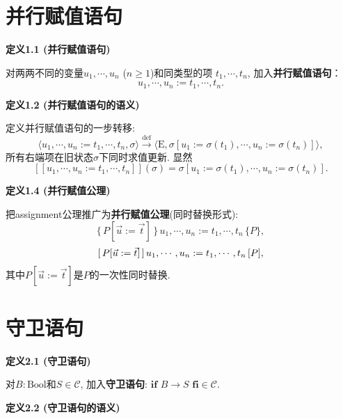 \documentclass[UTF8]{ctexart}
\begin{document}
\setlength{\abovedisplayskip}{1pt}
\setlength{\belowdisplayskip}{1pt}

\section{并行赋值语句}

\hypertarget{sec:定义1.1}{}
\noindent\textbf{定义1.1 (并行赋值语句)}

对两两不同的变量$u_1,\cdots,u_n$ ($n\geqslant1$)和同类型的项
$t_1,\cdots,t_n$, 加入\textbf{并行赋值语句}：
\[
    u_1,\cdots,u_n:=t_1,\cdots,t_n.
\]

\vspace{10pt}

\hypertarget{sec:定义1.2}{}
\noindent\textbf{定义1.2 (并行赋值语句的语义)}

定义并行赋值语句的一步转移:
\[
    \langle u_1,\cdots,u_n:=t_1,\cdots,t_n,\sigma\rangle
    \overset{\mathrm{def}}{\to}
    \langle\mathrm{E},\sigma[u_1:=\sigma(t_1),\cdots,u_n:=\sigma(t_n)]\rangle,
\]
所有右端项在旧状态$\sigma$下同时求值更新. 显然
\[
    [\![u_1,\cdots,u_n:=t_1,\cdots,t_n]\!](\sigma)
    =\sigma[u_1:=\sigma(t_1),\cdots,u_n:=\sigma(t_n)].
\]

\vspace{10pt}

\hypertarget{sec:定义1.4}{}
\noindent\textbf{定义1.4 (并行赋值公理)}

把assignment公理推广为\textbf{并行赋值公理}(同时替换形式):
\[
    \{\,P[\vec{u}:=\vec{t}]\,\}\,u_1,\cdots,u_n:=t_1,\cdots,t_n\,\{P\},
\]
\[
    [\,P[\vec{u}:=\vec{t}]\,]\,u_1,\cdots,u_n:=t_1,\cdots,t_n\,[P],\\[-3pt]
\]
其中$P[\vec{u}:=\vec{t}]$是$P$的一次性同时替换.





\vspace{30pt}

\section{守卫语句}

\hypertarget{sec:定义2.1}{}
\noindent\textbf{定义2.1 (守卫语句)}

对$B:\mathrm{Bool}$和$S\in\mathcal{C}$, 加入\textbf{守卫语句}:
$\mathbf{if}\,\,B\to S\,\,\mathbf{fi}\in\mathcal{C}$.

\vspace{10pt}

\hypertarget{sec:定义2.2}{}
\noindent\textbf{定义2.2 (守卫语句的语义)}
\end{document}
